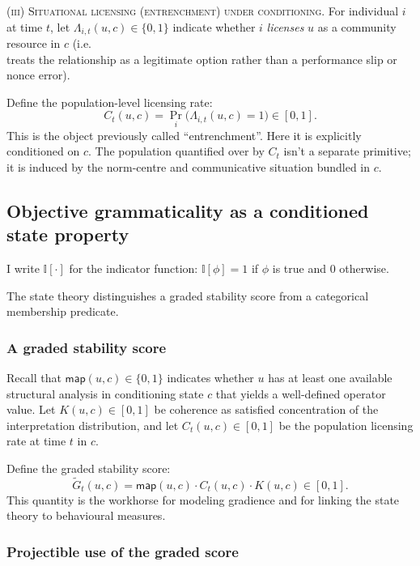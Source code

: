 \documentclass[12pt,letterpaper]{article}
\begin{document}
\textsc{(iii) Situational licensing (entrenchment) under conditioning.}
For individual $i$ at time $t$, let $\Lambda_{i,t}(u,c)\in\{0,1\}$ indicate whether
$i$ \emph{licenses} $u$ as a community resource in $c$ (i.e.\\ treats the relationship as
a legitimate option rather than a performance slip or nonce error).

Define the population-level licensing rate:
\begin{equation*}
C_t(u,c)=\Pr_i\bigl(\Lambda_{i,t}(u,c)=1\bigr)\in[0,1].
\end{equation*}
This is the object previously called \enquote{entrenchment}.  Here it is explicitly
conditioned on $c$. The population quantified over by $C_t$ isn't a separate primitive; it is induced by the norm-centre and communicative situation bundled in $c$.

\subsection{Objective grammaticality as a conditioned state property}
\label{sec:objective-G}

I write $\mathbb{I}[\cdot]$ for the indicator function:
$\mathbb{I}[\phi]=1$ if $\phi$ is true and $0$ otherwise.

The state theory distinguishes a graded stability score from a categorical
membership predicate.

\subsubsection{A graded stability score}

Recall that $\mathsf{map}(u,c)\in\{0,1\}$ indicates whether $u$ has at least one
available structural analysis in conditioning state $c$ that yields a
well-defined operator value. Let $K(u,c)\in[0,1]$ be coherence as satisfied
concentration of the interpretation distribution, and let $C_t(u,c)\in[0,1]$ be
the population licensing rate at time $t$ in $c$.

Define the graded stability score:
\begin{equation*}
\widetilde{G}_t(u,c)=\mathsf{map}(u,c)\cdot C_t(u,c)\cdot K(u,c)\in[0,1].
\end{equation*}
This quantity is the workhorse for modeling gradience and for linking the
state theory to behavioural measures.

\subsubsection{Projectible use of the graded score}
\label{sec:projectible-G}
\end{document}
